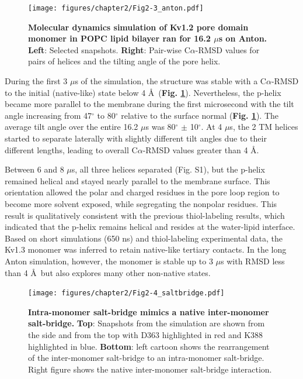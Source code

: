 \begin{figure}[!ht]
\begin{center}
	\texttt{[image: figures/chapter2/Fig2-3\_anton.pdf]}
\end{center}
	\caption{\textbf{Molecular dynamics simulation of Kv1.2 pore domain monomer in POPC lipid bilayer ran for 16.2 $\mu$s on Anton.} \textbf{Left}: Selected snapshots. \textbf{Right}: Pair-wise C$\alpha$-RMSD values for pairs of helices and the tilting angle of the pore helix.}
	\label{fig:ch2_f3}
\end{figure}

During the first 3 $\mu$s of the simulation, the structure was stable with a C$\alpha$-RMSD to the initial (native-like) state below 4 \AA \ (\textbf{Fig. \ref{fig:ch2_f3}}). Nevertheless, the p-helix became more parallel to the membrane during the first microsecond with the tilt angle increasing from 47$^{\circ}$ to 80$^{\circ}$ relative to the surface normal (\textbf{Fig. \ref{fig:ch2_f3}}). The average tilt angle over the entire 16.2 $\mu$s was 80$^{\circ}$ $\pm$ 10$^{\circ}$. At 4 $\mu$s, the 2 TM helices started to separate laterally with slightly different tilt angles due to their different lengths, leading to overall C$\alpha$-RMSD values greater than 4 \AA. 

Between 6 and 8 $\mu$s, all three helices separated (Fig. S1), but the p-helix remained helical and stayed nearly parallel to the membrane surface. This orientation allowed the polar and charged residues in the pore loop region to become more solvent exposed, while segregating the nonpolar residues. This result is qualitatively consistent with the previous thiol-labeling results, which indicated that the p-helix remains helical and resides at the water-lipid interface. \citep{delaney2014} Based on short simulations (650 ns) and thiol-labeling experimental data, the Kv1.3 monomer was inferred to retain native-like tertiary contacts. \citep{gajewski2011} In the long Anton simulation, however, the monomer is stable up to 3 $\mu$s with RMSD less than 4 \AA  \ but also explores many other non-native states.

\begin{figure}[!ht]
\begin{center}
	\texttt{[image: figures/chapter2/Fig2-4\_saltbridge.pdf]}
\end{center}
	\caption{\textbf{Intra-monomer salt-bridge mimics a native inter-monomer salt-bridge.} \textbf{Top}: Snapshots from the simulation are shown from the side and from the top with D363 highlighted in red and K388 highlighted in blue. \textbf{Bottom}: left cartoon shows the rearrangement of the inter-monomer salt-bridge to an intra-monomer salt-bridge. Right figure shows the native inter-monomer salt-bridge interaction.}
	\label{fig:ch2_f4}
\end{figure}


